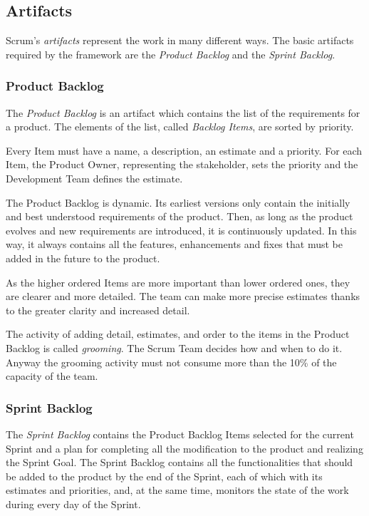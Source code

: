 		
		\subsection{Artifacts}\label{ref_scrum_artifacts}
			Scrum's \emph{artifacts} represent the work in many different ways. The basic artifacts required by the framework are the \emph{Product Backlog} and the \emph{Sprint Backlog}.

			\subsubsection{Product Backlog}\label{ref_scrum_prod_backlog}
			The \emph{Product Backlog} is an artifact which contains the list of the requirements for a product. The elements of the list, called \emph{Backlog Items}, are sorted by priority.

			Every Item must have a name, a description, an estimate and a priority. For each Item, the Product Owner, representing the stakeholder, sets the priority and the Development Team defines the estimate.

			The Product Backlog is dynamic. Its earliest versions only contain the initially and best understood requirements of the product. Then, as long as the product evolves and new requirements are introduced, it is continuously updated. In this way, it always contains all the features, enhancements and fixes that must be added in the future to the product.  

			As the higher ordered Items are more important than lower ordered ones, they are clearer and more detailed. The team can make more precise estimates thanks to the greater clarity and increased detail. 
			
			The activity of adding detail, estimates, and order to the items in the Product Backlog is called \emph{grooming}. The Scrum Team decides how and when to do it. Anyway the grooming activity must not consume more than the 10\% of the capacity of the team. 
		

			\subsubsection{Sprint Backlog}\label{ref_scrum_sprint_backlog}
			The \emph{Sprint Backlog} contains the Product Backlog Items selected for the current Sprint and a plan for completing all the modification to the product and realizing the Sprint Goal. 
			The Sprint Backlog contains all the functionalities that should be added to the product by the end of the Sprint, each of which with its estimates and priorities, and, at the same time, monitors the state of the work during every day of the Sprint.
			
